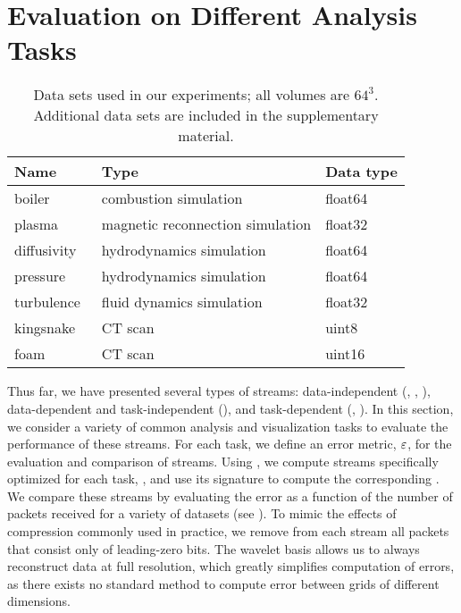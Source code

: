 \section{Evaluation on Different Analysis Tasks} \label{sec:analysis-tasks}

\begin{table}[b]
  \centering
	\begin{tabular}{l l l}
  \toprule
  Name & Type & Data type \\
  \midrule
  boiler & combustion simulation& float64\\
  plasma & magnetic reconnection simulation& float32\\
  diffusivity & hydrodynamics simulation& float64\\
  pressure & hydrodynamics simulation& float64\\
	turbulence~\cite{turbulence} & fluid dynamics simulation& float32\\
	kingsnake~\cite{kingsnake} & CT scan & uint8\\
	foam & CT scan & uint16\\
  \bottomrule
  \end{tabular}\label{tbl:data-sets}
  \vspace{-0.5em}
   \caption{Data sets used in our experiments; all volumes are $64^3$. Additional data sets are 
   included in the supplementary material.}
\end{table}

Thus far, we have presented several types of streams: data-independent (\slvl, \sbit, \swav),
data-dependent and task-independent (\smag), and task-dependent (\sopt, \ssig). In this section, we
consider a variety of common analysis and visualization tasks to evaluate the performance of these
streams. For each task, we define an error metric, $\err$, for the evaluation and comparison of
streams. Using , we compute streams specifically optimized for each task, \stkop,
and use its signature to compute the corresponding \stksg. We compare these streams by evaluating
the error as a function of the number of packets received for a variety of datasets (see
). To mimic the effects of compression commonly used in practice, we remove from
each stream all packets that consist only of leading-zero bits. The wavelet basis allows us to
always reconstruct data at full resolution, which greatly simplifies computation of errors, as there
exists no standard method to compute error between grids of different dimensions.

